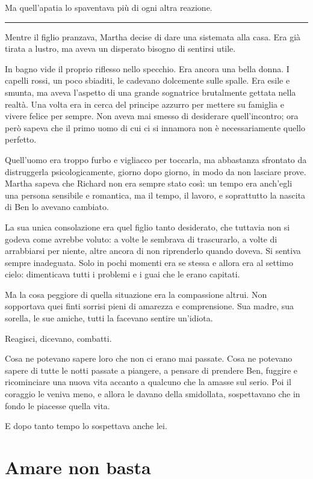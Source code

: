 \documentclass[a4paper,10pt]{memoir}
\begin{document}
Ma quell'apatia lo spaventava più di ogni altra reazione.

\plainbreak{1}

Mentre il figlio pranzava, Martha decise di dare una sistemata alla casa. Era già tirata a lustro, ma aveva un disperato
bisogno di sentirsi utile.

In bagno vide il proprio riflesso nello specchio. Era ancora una bella donna. I capelli rossi, un poco sbiaditi, le
cadevano dolcemente sulle spalle. Era esile e smunta, ma aveva l'aspetto di una grande sognatrice brutalmente gettata
nella realtà. Una volta era in cerca del principe azzurro per mettere su famiglia e vivere felice per sempre. Non aveva
mai smesso di desiderare quell'incontro; ora però sapeva che il primo uomo di cui ci si innamora non è necessariamente
quello perfetto.

Quell’uomo era troppo furbo e vigliacco per toccarla, ma abbastanza sfrontato da distruggerla psicologicamente, giorno
dopo giorno, in modo da non lasciare prove. Martha sapeva che Richard non era sempre stato così: un tempo era anch'egli
una persona sensibile e romantica, ma il tempo, il lavoro, e soprattutto la nascita di Ben lo avevano cambiato.

La sua unica consolazione era quel figlio tanto desiderato, che tuttavia non si godeva come avrebbe voluto: a volte le
sembrava di trascurarlo, a volte di arrabbiarsi per niente, altre ancora di non riprenderlo quando doveva. Si sentiva
sempre inadeguata. Solo in pochi momenti era se stessa e allora era al settimo cielo: dimenticava tutti i problemi e i
guai che le erano capitati.

Ma la cosa peggiore di quella situazione era la compassione altrui. Non sopportava quei finti sorrisi pieni di amarezza
e comprensione. Sua madre, sua sorella, le sue amiche, tutti la facevano sentire un'idiota.

Reagisci, dicevano, combatti.

Cosa ne potevano sapere loro che non ci erano mai passate. Cosa ne potevano sapere di tutte le notti passate a piangere,
a pensare di prendere Ben, fuggire e ricominciare una nuova vita accanto a qualcuno che la amasse sul serio. Poi il
coraggio le veniva meno, e allora le davano della smidollata, sospettavano che in fondo le piacesse quella vita.

E dopo tanto tempo lo sospettava anche lei.

\chapter{Amare non basta}
\end{document}
